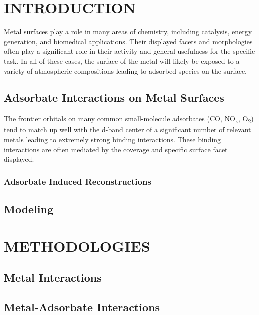 \documentclass[draft]{nddiss2e}
\begin{document}
\mainmatter

\chapter{INTRODUCTION}
Metal surfaces play a role in many areas of chemistry, including catalysis,
energy generation, and biomedical applications. Their displayed facets and
morphologies often play a significant role in their activity and general
usefulness for the specific task. In all of these cases, the surface of the
metal will likely be exposed to a variety of atmospheric compositions leading
to adsorbed species on the surface. 

\section{Adsorbate Interactions on Metal Surfaces}
The frontier orbitals on many common small-molecule adsorbates (CO,
NO\textsubscript{x}, O\textsubscript{2}) tend to match up well with the d-band
center of a significant number of relevant metals leading to extremely strong
binding interactions. These binding interactions are often mediated by the
coverage and specific surface facet displayed.


\subsection{Adsorbate Induced Reconstructions}

\section{Modeling}


\chapter{METHODOLOGIES}

\section{Metal Interactions}

\section{Metal-Adsorbate Interactions}
\end{document}
